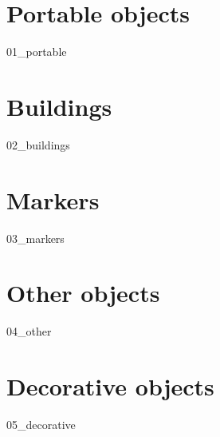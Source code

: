 \chapter{Portable objects}
{01_portable}

\chapter{Buildings}
{02_buildings}

\chapter{Markers}
{03_markers}

\chapter{Other objects}
{04_other}

\chapter{Decorative objects}
{05_decorative}